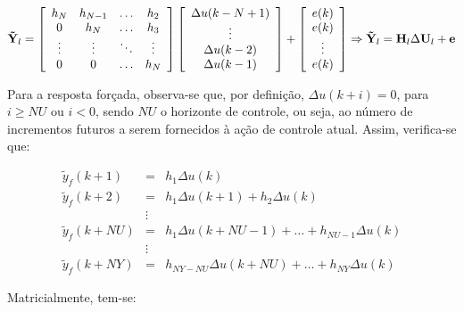 \begin{equation}\label{eq:resp_livre_mat}
\mathbf{\tilde{Y}}_l = 
\left[
    \begin{array}{cccc}
        h_N & h_{N-1} & \ldots & h_2\\
        0 & h_N & \ldots & h_3\\
        \vdots & \vdots & \ddots & \vdots\\
        0 & 0 & \ldots & h_N
    \end{array}
\right]
\left[
    \begin{array}{c}
        \Delta u(k-N+1)\\
        \vdots\\
        \Delta u(k-2)\\
        \Delta u(k-1)
    \end{array}
\right]
+
\left[
    \begin{array}{c}
        e(k)\\
        e(k)\\
        \vdots\\
        e(k)
    \end{array}
\right]
\Rightarrow\mathbf{\tilde{Y}}_l = \mathbf{H}_l\Delta\mathbf{U}_l + \mathbf{e}
\end{equation}

Para a resposta forçada, observa-se que, por definição, $\Delta u(k+i) = 0$,
para $i \geq NU$ ou $i < 0$, sendo $NU$ o horizonte de controle, ou seja, ao
número de incrementos futuros a serem fornecidos à ação de controle atual.
Assim, verifica-se que:

\begin{eqnarray}
\tilde{y}_f(k+1)  & = & h_1\Delta u(k)\nonumber\\
\tilde{y}_f(k+2)  & = & h_1\Delta u(k+1) + h_2\Delta u(k)\nonumber\\
& \vdots & \nonumber\\
\tilde{y}_f(k+NU) & = & h_1\Delta u(k+NU-1) + \ldots + 
                        h_{NU-1}\Delta u(k)\nonumber\\
& \vdots & \nonumber\\
\tilde{y}_f(k+NY) & = & h_{NY-NU}\Delta u(k+NU) + \ldots + 
                        h_{NY}\Delta u(k)\nonumber
\end{eqnarray}

Matricialmente, tem-se:

